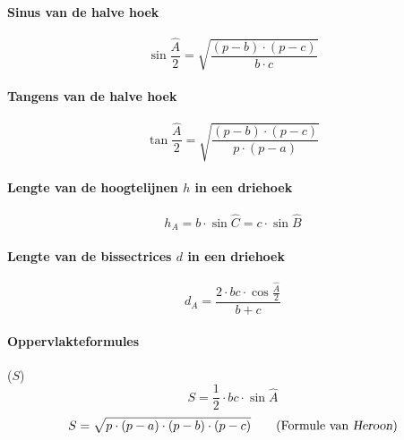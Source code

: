 \paragraph{Sinus van de halve hoek}
\label{sec:SinusHalveHoek}
   \[
	    \sin\frac{\widehat{A}}{2}=\sqrt{\frac{\left(p-b\right) \cdot \left(p-c\right)}{b \cdot c}}
   \]
  
\paragraph{Tangens van de halve hoek}
\label{sec:TangensVanDeHalveHoek}
   \[
	    \tan\frac{\widehat{A}}{2}=\sqrt{\frac{\left(p-b\right) \cdot \left(p-c\right)}{p\cdot\left(p-a\right)}}
   \]

\paragraph{Lengte van de hoogtelijnen $h$ in een driehoek}
\label{sec:LengteVanDeHoogtelijnen}
   \[
	   h_{A}= b \cdot \sin \widehat{C} = c \cdot \sin \widehat{B}
   \]
  
\paragraph{Lengte van de bissectrices $d$ in een driehoek}
\label{sec:LengteVanDeBissectrices}
   \[
	   d_{A}=\frac{2 \cdot bc \cdot \cos \frac{\widehat{A}}{2}}{b + c}
   \]
  
\paragraph{Oppervlakteformules}
\label{sec:OppervlakteformulesWKDriehoek}
 ($S$)
   \[
	    S= \frac{1}{2}\cdot bc \cdot \sin \widehat{A} 
   \]
   \[
	    S=\sqrt{p \cdot \left(p-a\right) \cdot \left(p-b\right) \cdot \left(p-c\right)} 
	    \qquad \textrm{(Formule van \textsl{Heroon})}
   \]
  